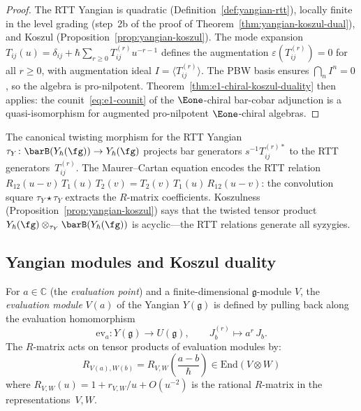 \begin{proof}
The RTT Yangian is quadratic (Definition~\ref{def:yangian-rtt}),
locally finite in the level grading (step~2b of the proof of
Theorem~\ref{thm:yangian-koszul-dual}), and Koszul
(Proposition~\ref{prop:yangian-koszul}).  The mode expansion
$T_{ij}(u) = \delta_{ij} + \hbar \sum_{r \geq 0} T_{ij}^{(r)}
u^{-r-1}$ defines the augmentation $\varepsilon(T_{ij}^{(r)}) = 0$
for all $r \geq 0$, with augmentation ideal $I = \langle
T_{ij}^{(r)} \rangle$.  The PBW basis ensures $\bigcap_n I^n = 0$,
so the algebra is pro-nilpotent.
Theorem~\ref{thm:e1-chiral-koszul-duality} then applies:
the counit~\eqref{eq:e1-counit} of the $\Eone$-chiral bar-cobar
adjunction is a quasi-isomorphism for augmented pro-nilpotent
$\Eone$-chiral algebras.
\end{proof}

\begin{remark}
\label{rem:yangian-twisting-morphism}
The canonical twisting morphism for the RTT Yangian
$\tau_Y \colon \barB(Y_\hbar(\fg)) \to Y_\hbar(\fg)$
projects bar generators $s^{-1}T_{ij}^{(r)*}$ to the RTT
generators~$T_{ij}^{(r)}$.  The Maurer--Cartan equation encodes the
RTT relation $R_{12}(u-v)\, T_1(u)\, T_2(v) = T_2(v)\, T_1(u)\, R_{12}(u-v)$:
the convolution square $\tau_Y \star \tau_Y$ extracts the $R$-matrix
coefficients.  Koszulness (Proposition~\ref{prop:yangian-koszul})
says that the twisted tensor product
$Y_\hbar(\fg) \otimes_{\tau_Y} \barB(Y_\hbar(\fg))$
is acyclic---the RTT relations generate all syzygies.
\end{remark}

\subsection{Yangian modules and Koszul duality}

\begin{definition}\label{def:yangian-evaluation}
For $a \in \mathbb{C}$ (the \emph{evaluation point}) and a
finite-dimensional $\mathfrak{g}$-module $V$, the \emph{evaluation
module} $V(a)$ of the Yangian $Y(\mathfrak{g})$ is defined by
pulling back along the evaluation homomorphism
\[
\mathrm{ev}_a\colon Y(\mathfrak{g}) \to U(\mathfrak{g}),
\qquad
J^{(r)}_b \mapsto a^r\, J_b.
\]
The $R$-matrix acts on tensor products of evaluation modules by:
\begin{equation}\label{eq:yangian-r-matrix}
R_{V(a), W(b)}
= R_{V,W}\!\left(\frac{a - b}{\hbar}\right)
\in \mathrm{End}(V \otimes W)
\end{equation}
where $R_{V,W}(u) = 1 + r_{V,W}/u + O(u^{-2})$ is the rational
$R$-matrix in the representations~$V, W$.
\end{definition}


